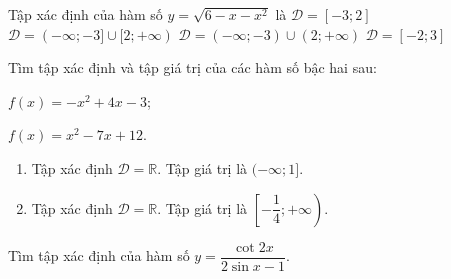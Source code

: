 \begin{ex}%
	 Tập xác định của hàm số $y=\sqrt{6-x-x^2}$ là
	 \choice
		{\True $\mathscr{D}=[-3;2]$} 
		 {$\mathscr{D}=(-\infty;-3]\cup[2;+\infty)$}
		{$\mathscr{D}=(-\infty;-3)\cup(2;+\infty)$} 
		 {$\mathscr{D}=[-2;3]$}
\end{ex}

\begin{bt}%
	Tìm tập xác định và tập giá trị của các hàm số bậc hai sau:
	\begin{listEX}[2]
		\item $f(x)=-x^2+4 x-3$;
		\item $f(x)=x^2-7 x+12$.
	\end{listEX}
	\loigiai
	{
		\begin{enumerate}
			\item Tập xác định $\mathscr{D}=\mathbb{R}$. Tập giá trị là $(-\infty; 1]$.
			\item Tập xác định $\mathscr{D}=\mathbb{R}$. Tập giá trị là $\left[-\dfrac{1}{4};+\infty\right)$.			
		\end{enumerate}
	}
\end{bt}

\begin{bt}%
	Tìm tập xác định của hàm số $y=\dfrac{\cot 2x}{2\sin x-1}$.
\end{bt}

